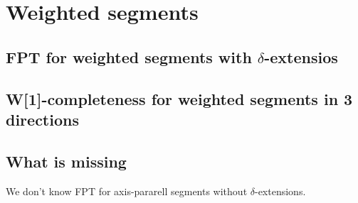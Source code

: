 \section{Weighted segments}
\subsection{FPT for weighted segments with $\delta$-extensios}

\subsection{W[1]-completeness for weighted segments in 3 directions}

\subsection{What is missing}
We don't know FPT for axis-pararell segments without $\delta$-extensions.
